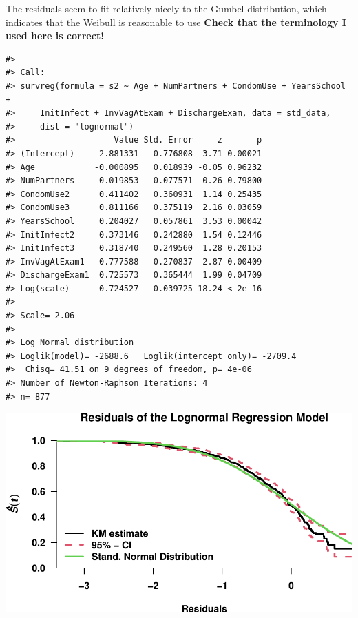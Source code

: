 \documentclass[
]{article}
\begin{document}
The residuals seem to fit relatively nicely to the Gumbel distribution, which indicates that the Weibull is reasonable to use \textbf{Check that the terminology I used here is correct!}

\begin{verbatim}
#> 
#> Call:
#> survreg(formula = s2 ~ Age + NumPartners + CondomUse + YearsSchool + 
#>     InitInfect + InvVagAtExam + DischargeExam, data = std_data, 
#>     dist = "lognormal")
#>                    Value Std. Error     z       p
#> (Intercept)     2.881331   0.776808  3.71 0.00021
#> Age            -0.000895   0.018939 -0.05 0.96232
#> NumPartners    -0.019853   0.077571 -0.26 0.79800
#> CondomUse2      0.411402   0.360931  1.14 0.25435
#> CondomUse3      0.811166   0.375119  2.16 0.03059
#> YearsSchool     0.204027   0.057861  3.53 0.00042
#> InitInfect2     0.373146   0.242880  1.54 0.12446
#> InitInfect3     0.318740   0.249560  1.28 0.20153
#> InvVagAtExam1  -0.777588   0.270837 -2.87 0.00409
#> DischargeExam1  0.725573   0.365444  1.99 0.04709
#> Log(scale)      0.724527   0.039725 18.24 < 2e-16
#> 
#> Scale= 2.06 
#> 
#> Log Normal distribution
#> Loglik(model)= -2688.6   Loglik(intercept only)= -2709.4
#>  Chisq= 41.51 on 9 degrees of freedom, p= 4e-06 
#> Number of Newton-Raphson Iterations: 4 
#> n= 877
\end{verbatim}

\includegraphics{practical_files/figure-latex/fit-lognormal-1.pdf}
\end{document}
